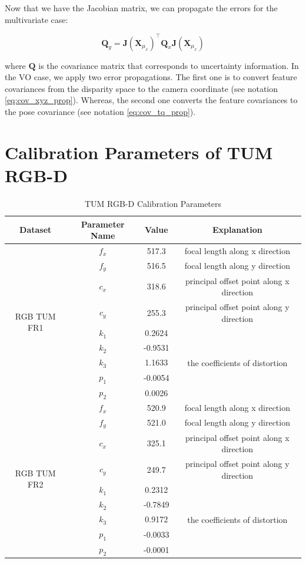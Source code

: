 \documentclass[a4paper]{report}
\numberwithin{figure}{section}
\begin{document}
\begin{appendices}
Now that we have the Jacobian matrix, we can propagate the errors for 
the multivariate case:

\begin{equation}
  \mathbf{Q}_y = \mathbf{J}(\mathbf{X}_{\mu_x})^\top \mathbf{Q}_x 
  \mathbf{J}(\mathbf{X}_{\mu_x})
\end{equation}

where $\mathbf{Q}$ is the covariance matrix that corresponds to uncertainty information.
In the VO case, we apply two error propagations. The first one is to convert 
feature covariances from the disparity space to the camera coordinate 
(see notation \eqref{eq:cov_xyz_prop}). Whereas, the second one converts 
the feature covariances to the pose covariance (see notation 
\eqref{eq:cov_tq_prop}).

\section{Calibration Parameters of TUM RGB-D}

\begin{table}[H]
	\caption{TUM RGB-D Calibration Parameters}
	\centering
  \begin{tabular}{c|c|c|c}
    Dataset & Parameter Name & Value & Explanation\\
    \hline
    \multirow{9}{*}{RGB TUM FR1} & $f_x$ & 517.3 & focal length along x 
    direction\\
    & $f_y$ & 516.5 & focal length along y direction\\
    & $c_x$ & 318.6 & principal offset point along x direction\\
    & $c_y$ & 255.3 & principal offset point along y direction\\
    & $k_1$ & 0.2624 & \multirow{5}{*}{the coefficients of distortion}\\
    & $k_2$ & -0.9531 & \\
    & $k_3$ & 1.1633 & \\
    & $p_1$ & -0.0054 & \\
    & $p_2$ & 0.0026 & \\
    \hline
    \multirow{9}{*}{RGB TUM FR2} & $f_x$ & 520.9 & focal length along x 
    direction\\
    & $f_y$ & 521.0 & focal length along y direction\\
    & $c_x$ & 325.1 & principal offset point along x direction\\
    & $c_y$ & 249.7 & principal offset point along y direction\\
    & $k_1$ & 0.2312 & \multirow{5}{*}{the coefficients of distortion}\\
    & $k_2$ & -0.7849 & \\
    & $k_3$ & 0.9172 & \\
    & $p_1$ & -0.0033 & \\
    & $p_2$ & -0.0001 & \\
\end{tabular}	
\label{tb:tum_calib_param}
\end{table}



\end{appendices}
\end{document}
